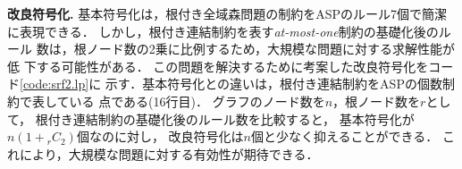 \textbf{改良符号化.}
基本符号化は，根付き全域森問題の制約をASPのルール7個で簡潔に表現できる．
しかし，根付き連結制約を表す\textit{at-most-one}制約の基礎化後のルール
数は，根ノード数の2乗に比例するため，大規模な問題に対する求解性能が低
下する可能性がある．
%
この問題を解決するために考案した改良符号化をコード\ref{code:srf2.lp}に
示す．基本符号化との違いは，根付き連結制約をASPの個数制約で表している
点である(16行目)．
グラフのノード数を$n$，根ノード数を$r$として，
根付き連結制約の基礎化後のルール数を比較すると，
基本符号化が$n(1+{}_{r}C_{2})$個なのに対し，
改良符号化は$n$個と少なく抑えることができる．
これにより，大規模な問題に対する有効性が期待できる．

